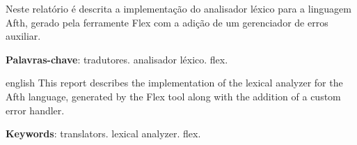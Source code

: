\documentclass[
	article,			%
	11pt,				%
	oneside,			%
	a4paper,			%
	english,			%
	brazil,				%
	sumario=tradicional
	]{abntex2}
\begin{document}

\frenchspacing 


%
%

\maketitle





\begin{resumoumacoluna}
	Neste relatório é descrita a implementação do analisador léxico
	para a linguagem Afth, gerado pela ferramente Flex com a adição
	de um gerenciador de erros auxiliar.

	\vspace{\onelineskip}
	 
	\noindent
	\textbf{Palavras-chave}: tradutores. analisador léxico. flex.
\end{resumoumacoluna}


\renewcommand{\resumoname}{Abstract}
\begin{resumoumacoluna}
	\begin{otherlanguage*}{english}
		This report describes the implementation of the lexical
		analyzer for the Afth language, generated by the Flex tool
		along with the addition of a custom error handler.

		\vspace{\onelineskip}
		 
		\noindent
		\textbf{Keywords}: translators. lexical analyzer. flex.
	\end{otherlanguage*}  
\end{resumoumacoluna}


\begin{center}\smaller
	
	
\end{center}
\end{document}
